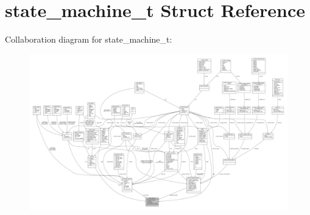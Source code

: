 \hypertarget{structstate__machine__t}{\section{state\+\_\+machine\+\_\+t Struct Reference}
\label{structstate__machine__t}
}


Collaboration diagram for state\+\_\+machine\+\_\+t\+:
\nopagebreak
\begin{figure}[H]
\begin{center}
\leavevmode
\includegraphics[width=350pt]{structstate__machine__t__coll__graph}
\end{center}
\end{figure}
